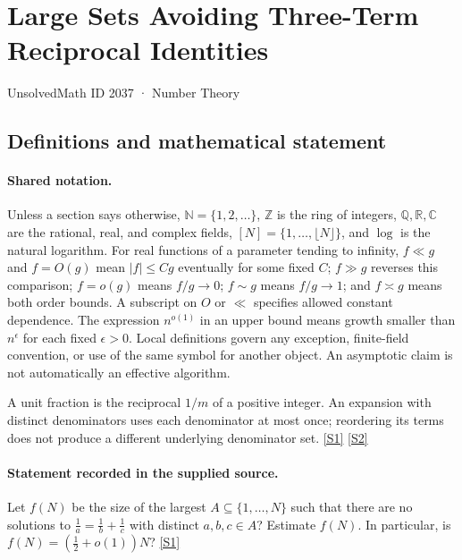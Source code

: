 \documentclass[11pt,a4paper]{article}
\newcommand{\N}{\mathbb{N}}
\newcommand{\Z}{\mathbb{Z}}
\newcommand{\Q}{\mathbb{Q}}
\newcommand{\R}{\mathbb{R}}
\newcommand{\C}{\mathbb{C}}
\newcommand{\sref}[2]{\hyperlink{source:#1:#2}{[S#2]}}
\begin{document}

\setcounter{section}{2036}

\section{Large Sets Avoiding Three-Term Reciprocal Identities}\label{2037}

{\small\sffamily UnsolvedMath ID 2037 · Number Theory}

\subsection{Definitions and mathematical statement}

\paragraph{Shared notation.}Unless a section says otherwise, $\N=\{1,2,\ldots\}$,
$\Z$ is the ring of integers, $\Q,\R,\C$ are the rational, real, and complex
fields, $[N]=\{1,\ldots,\lfloor N\rfloor\}$, and $\log$ is the natural
logarithm. For real functions of a parameter tending to infinity,
$f\ll g$ and $f=O(g)$ mean $|f|\leq Cg$ eventually for some fixed $C$;
$f\gg g$ reverses this comparison; $f=o(g)$ means $f/g\to0$;
$f\sim g$ means $f/g\to1$; and $f\asymp g$ means both order bounds.
A subscript on $O$ or $\ll$ specifies allowed constant dependence.
The expression $n^{o(1)}$ in an upper bound means growth smaller than
$n^\epsilon$ for each fixed $\epsilon>0$. Local definitions govern any
exception, finite-field convention, or use of the same symbol for another
object. An asymptotic claim is not automatically an effective algorithm.



A unit fraction is the reciprocal $1/m$ of a positive integer. An expansion with distinct denominators uses each denominator at most once; reordering its terms does not produce a different underlying denominator set. \sref{2037}{1} \sref{2037}{2}

\paragraph{Statement recorded in the supplied source.}
Let $f(N)$ be the size of the largest $A\subseteq \{1,\ldots,N\}$ such that there are no solutions to $ \frac{1}{a}= \frac{1}{b}+\frac{1}{c} $ with distinct $a,b,c\in A$?
Estimate $f(N)$. In particular, is $f(N)=(\tfrac{1}{2}+o(1))N$? \sref{2037}{1}
\end{document}
